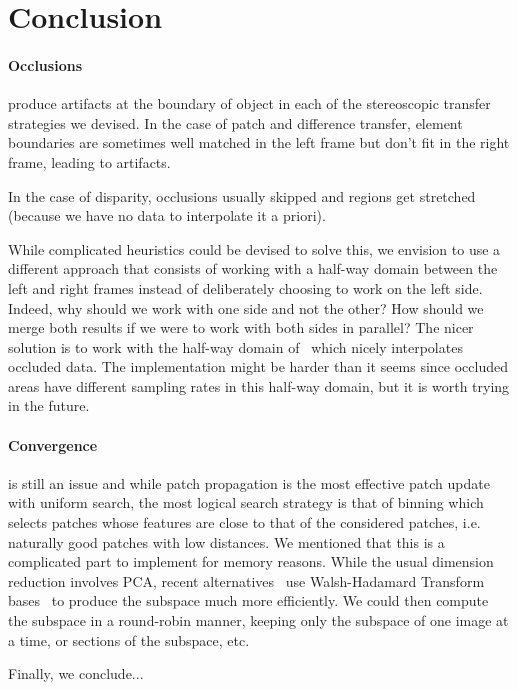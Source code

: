 

\section{Conclusion}


\paragraph{Occlusions} produce artifacts at the boundary of object in each of the stereoscopic transfer strategies we devised.
In the case of patch and difference transfer, element boundaries are sometimes well matched in the left frame but don't fit in the right frame, leading to artifacts.


In the case of disparity, occlusions usually skipped and regions get stretched (because we have no data to interpolate it a priori).


While complicated heuristics could be devised to solve this, we envision to use a different approach that consists of working with a half-way domain between the left and right frames instead of deliberately choosing to work on the left side.
Indeed, why should we work with one side and not the other? How should we merge both results if we were to work with both sides in parallel?
The nicer solution is to work with the half-way domain of~\cite{} which nicely interpolates occluded data.
The implementation might be harder than it seems since occluded areas have different sampling rates in this half-way domain, but it is worth trying in the future.

\paragraph{Convergence} is still an issue and while patch propagation is the most effective patch update with uniform search, the most logical search strategy is that of binning which selects patches whose features are close to that of the considered patches, i.e. naturally good patches with low distances.
We mentioned that this is a complicated part to implement for memory reasons.
While the usual dimension reduction involves PCA, recent alternatives~\cite{He12} use Walsh-Hadamard Transform bases~\cite{Hel05} to produce the subspace much more efficiently.
We could then compute the subspace in a round-robin manner, keeping only the subspace of one image at a time, or sections of the subspace, etc.

Finally, we conclude...
